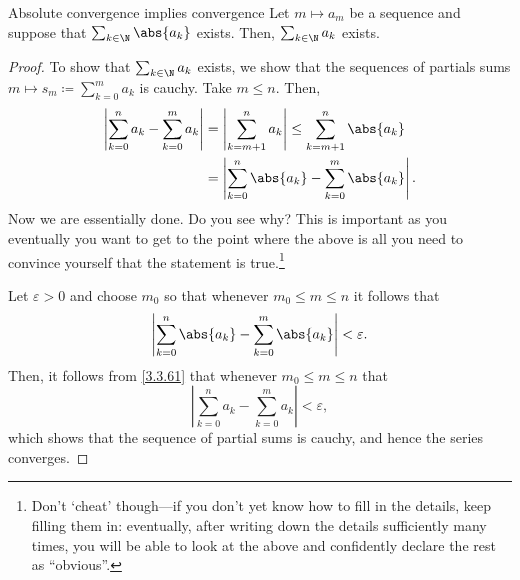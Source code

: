 \begin{prp}{Absolute convergence implies convergence}{}
Let $m\mapsto a_m$ be a sequence and suppose that $\sum _{k\in \N}\abs{a_k}$ exists.  Then, $\sum _{k\in \N}a_k$ exists.
\begin{proof}
To show that $\sum _{k\in \N}a_k$ exists, we show that the sequences of partials sums $m\mapsto s_m\coloneqq \sum _{k=0}^ma_k$ is cauchy.  Take $m\leq n$.  Then,
\begin{equation}\label{3.3.61}
\begin{split}
\left| \sum _{k=0}^na_k-\sum _{k=0}^ma_k\right| & =\left| \sum _{k=m+1}^na_k\right| \leq \sum _{k=m+1}^n\abs{a_k} \\
& =\left| \sum _{k=0}^n\abs{a_k}-\sum _{k=0}^m\abs{a_k}\right| .
\end{split}
\end{equation}
Now we are essentially done.  Do you see why?  This is important as you eventually you want to get to the point where the above is all you need to convince yourself that the statement is true.\footnote{Don't `cheat' though---if you don't yet know how to fill in the details, keep filling them in:  eventually, after writing down the details sufficiently many times, you will be able to look at the above and confidently declare the rest as ``obvious''.}

Let $\varepsilon >0$ and choose $m_0$ so that whenever $m_0\leq m\leq n$ it follows that
\begin{equation}
\left| \sum _{k=0}^n\abs{a_k}-\sum _{k=0}^m\abs{a_k}\right| <\varepsilon .
\end{equation}
Then, it follows from \eqref{3.3.61} that whenever $m_0\leq m\leq n$ that
\begin{equation}
\left| \sum _{k=0}^na_k-\sum _{k=0}^ma_k\right| <\varepsilon ,
\end{equation}
which shows that the sequence of partial sums is cauchy, and hence the series converges.
\end{proof}
\end{prp}

